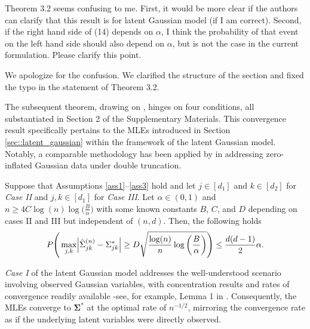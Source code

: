 \begin{point}
    Theorem 3.2 seems confusing to me. First, it would be more clear if the authors can clarify that this result is for latent Gaussian model (if I am correct). Second, if the right hand side of (14) depends on \(\alpha\), I think the probability of that event on the left hand side should also depend on \(\alpha\), but is not the case in the current formulation. Please clarify this point.
\end{point}

\begin{reply}
    We apologize for the confusion. We clarified the structure of the section and fixed the typo in the statement of Theorem 3.2.
\end{reply}

\begin{change}
    The subsequent theorem, drawing on \citet{Mei18}, hinges on four conditions, all substantiated in Section 2 of the Supplementary Materials. This convergence result specifically pertains to the MLEs introduced in Section \ref{sec::latent_gaussian} within the framework of the latent Gaussian model. Notably, a comparable methodology has been applied by \citet{Anne19} in addressing zero-inflated Gaussian data under double truncation.

    \begin{theorem*}
        Suppose that Assumptions \ref{ass1}--\ref{ass3} hold and let $j \in [d_1]$ and $k \in [d_2]$ for  \textit{Case II} and $j,k \in [d_1]$ for \textit{Case III}. Let $\alpha \in (0,1)$ and \(n \geq 4 C \log(n) \log\Big(\frac{B}{\alpha}\Big)\) with some known constants $B$, $C$, and $D$ depending on cases II and III but independent of $(n,d)$. Then, the following holds
        \begin{equation}
            P\Bigg(\max_{j,k}\abs{\hat{\Sigma}_{jk}^{(n)} - \Sigma_{jk}^{*}} \geq D\sqrt{\frac{\log(n)}{n} \log\bigg(\frac{B}{\alpha}\bigg)}\Bigg) \leq \frac{d(d-1)}{2}\alpha.
        \end{equation}
    \end{theorem*}
    \textit{Case I} of the latent Gaussian model addresses the well-understood scenario involving observed Gaussian variables, with concentration results and rates of convergence readily available -see, for example, Lemma 1 in \citet{Ravikumar11}. Consequently, the MLEs converge to \(\mathbf{\Sigma}^{*}\) at the optimal rate of \(n^{-1/2}\), mirroring the convergence rate as if the underlying latent variables were directly observed.
\end{change}


